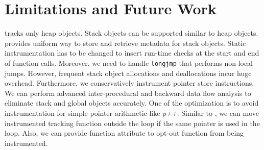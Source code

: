 \section{Limitations and Future Work}
\projectname{} tracks only heap objects. Stack objects can be supported similar to heap objects. \metalloc{} provides uniform way to store and retrieve metadata for stack objects. Static instrumentation has to be changed to insert run-time checks at the start and end of function calls. Moreover, we need to handle \texttt{longjmp} that performs non-local jumps. However, frequent stack object allocations and deallocations incur huge overhead. Furthermore, we conservatively instrument pointer store instructions. We can perform advanced inter-procedural and backward data flow analysis to eliminate stack and global objects accurately. One of the optimization is to avoid instrumentation for simple pointer arithmetic like \emph{p++}. Similar to \freesentry{}, we can move instrumented tracking function outside the loop if the same pointer is used in the loop. Also, we can provide function attribute to opt-out function from being instrumented. 

 